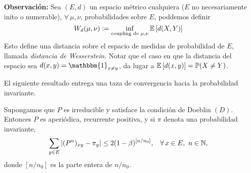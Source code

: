 \textbf{Observación: }Sea $(E,d)$ un espacio métrico cualquiera ($E$ no necesariamente inito o numerable), $\forall\,\mu,\nu$, probabilidades sobre $E$, poddemos definir
\[W_d(\mu,\nu) :=\inf_{\text{coupling de }\mu,\nu} \mathbb E\left[d(X,Y)\right]\]
Esto define una distancia sobre el espacio de medidas de probabilidad de $E$, llamada \textit{distancia de Wesserstein}. Notar que el caso en que la distancia del espacio sea $d(x,y)=\mathbbm{1}_{x\neq y}$, da lugar a $\mathbb E\left[d(x,y)\right] = \mathbb{P}(X\neq Y)$.\\ \newline

El siguiente resultado entrega una taza de convergencia hacia la probabilidad invariante.

\begin{teorema}
Supongamos que $P$ es irreducible y satisface la condición de Doeblin $(D)$. Entonces $P$ es aperiódica, recurrente positiva, y si $\pi$ denota una probabilidad invariante, 
\[\sum_{y\in E}|(P^n)_{xy}-\pi_y| \leq 2(1-\beta)^{[n/n_0]},\hspace{0.3cm}\forall\,x\in E,\,\,n\in \mathbb N,\]
donde $[n/n_0]$ es la parte entera de $n/n_0$.
\end{teorema}

